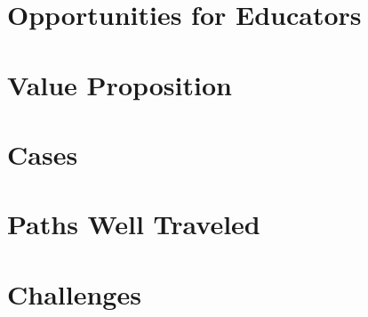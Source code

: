 \documentclass{beamer}
\begin{document}
\section{Opportunities for Educators}
\begin{comment}
* What can you do?
**  Who's there to help you?
** Who's working on this?
\end{comment}

\section{Value Proposition}
\begin{comment}
* Why make the connection?
** Legitimate Peripheral Participation & situated learning
*** Students can engage -- the currency is desire and energy
** Community of educators
*** Local (institutional)
*** Global (distributed)
*** A community of practice as opposed to a research community
\end{comment}

\section{Cases}
\begin{comment}
* Cases
** Case study: Scientific Computing (we know this target exists)
*** Target user: a senior physics major who knows some C, and wants to either 1) contribute to a project or 2) do some research and feed it back into a community
*** Write wiki articles instead of writing a paper.
*** http://www.scipy.org/Getting_Started
*** http://www.opensourcephysics.org/
**** Extend with projects that run on the EC2 compute cloud / GPGPUs
*** Automation of experiments / Arduino
\end{comment}

\section{Paths Well Traveled}
\begin{comment}
* existing programmes and opportunities
** GSOC
** Creative Commons uni program
** Wikipedia Prof Program
** TOS (sorta) / POSSE? (maybe)
\end{comment}

\section{Challenges}
\begin{comment}
* Challenges of doing open community stuff with students
** Some problems remaining to solve (for instance, IRC's interface sucks, community members don't always understand the "shoot self in foot" redirection need, hard to find projects, etc)
\end{comment}
\end{document}
